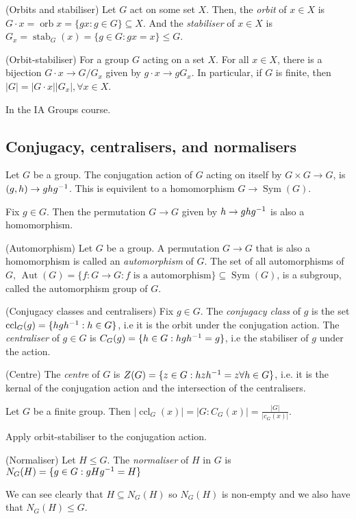 \documentclass{article}
\DeclareMathOperator{\sym}{Sym}
\DeclareMathOperator{\orb}{orb}
\DeclareMathOperator{\stab}{stab}
\DeclareMathOperator{\aut}{Aut}
\DeclareMathOperator{\ccl}{ccl}
\begin{document}
\begin{definition}
	(Orbits and stabiliser) Let $ G $ act on some set $ X $. Then, the \textit{orbit} of $ x\in X $ is $ G\cdot x=\orb x=\{gx : g\in G\}\subseteq X $. And the \textit{stabiliser} of $ x\in X $ is $ G_x=\stab_G(x) = \{g\in G:gx=x\}\le G $.
\end{definition}
\begin{theorem}
	(Orbit-stabiliser) For a group $ G $ acting on a set $ X $. For all $ x\in X $, there is a bijection $ G\cdot x \to G/G_x $ given by $ g\cdot x \to gG_x $. In particular, if $ G $ is finite, then $ |G|=|G\cdot x||G_x|, \forall x\in X $.
\end{theorem}
\pf In the IA Groups course.
\subsection{Conjugacy, centralisers, and normalisers}
Let $ G $ be a group. The conjugation action of $ G $ acting on itself by $ G\times G\to G $, is $ (g,h)\to gh{g}^{-1} $. This is equivilent to a homomorphism $ G\to\sym(G) $.

\par
Fix $ g\in G $. Then the permutation $ G\to G $ given by $ h\to gh{g}^{-1} $ is also a homomorphism.

\begin{definition}
	(Automorphism) Let $ G $ be a group. A permutation $ G\to G $ that is also a homomorphism is called an \textit{automorphism} of $ G $. The set of all automorphisms of $ G $, $ \aut(G) =\{f:G\to G: f \text{ is a automorphism}\}\subseteq \sym(G) $, is a subgroup, called the automorphism group of $ G $.
\end{definition}

\begin{definition}
	(Conjugacy classes and centralisers) Fix $ g\in G $. The \textit{conjugacy class} of $ g $ is the set $ \ccl_G(g) = \{hg\inv h: h\in G\} $, i.e it is the orbit under the conjugation action. The \textit{centraliser} of $ g\in G $ is $ C_G(g)=\{h\in G:hg{h}^{-1}=g\} $, i.e the stabiliser of $ g $ under the action.
\end{definition}
\begin{definition}
	(Centre) The \textit{centre} of $ G $ is $ Z(G)=\{z\in G:hz{h}^{-1}=z\forall h\in G\} $, i.e. it is the kernal of the conjugation action and the intersection of the centralisers.
\end{definition}
\begin{corollary}
	Let $ G $ be a finite group. Then $ |\ccl_G(x)|=|G:C_G(x)|=\frac{|G|}{|c_G(x)|} $.
\end{corollary}	
\pf Apply orbit-stabiliser to the conjugation action.
\begin{definition}
	(Normaliser) Let $ H\le G $. The \textit{normaliser} of $ H $ in $ G $ is $ N_G(H)=\{g\in G: gH{g}^{-1} = H\} $
\end{definition}
We can see clearly that $ H\subseteq N_G(H) $ so $ N_G(H) $ is non-empty and we also have that $ N_G(H)\le G $.
\end{document}
